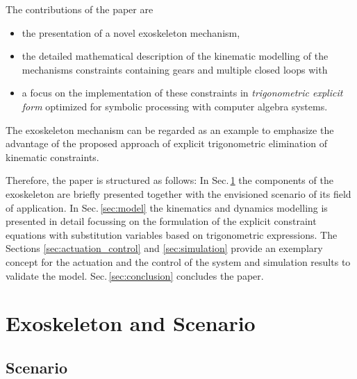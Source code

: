 \documentclass[letterpaper, 10 pt, conference]{ieeeconf}  %
\begin{document}
%
%
%
%
%

The contributions of the paper are
\begin{itemize}
    \item the presentation of a novel exoskeleton mechanism,
    \item the detailed mathematical description of the kinematic modelling of the mechanisms constraints containing gears and multiple closed loops with
    \item a focus on the implementation of these constraints in \emph{trigonometric explicit form} optimized for symbolic processing with computer algebra systems.
\end{itemize}

The exoskeleton mechanism can be regarded as an example to emphasize the advantage of the proposed approach of explicit trigonometric elimination of kinematic constraints.

Therefore, the paper is structured as follows:
In Sec.\,\ref{sec:exo_scenario} the components of the exoskeleton are briefly presented together with the envisioned scenario of its field of application. In Sec.\,\ref{sec:model} the kinematics and dynamics modelling is presented in detail focussing on the formulation of the explicit constraint equations with substitution variables based on trigonometric expressions.
The Sections \ref{sec:actuation_control} and
\ref{sec:simulation} provide an exemplary concept for the actuation and the control of the system and simulation results to validate the model. Sec.\,\ref{sec:conclusion} concludes the paper.

\section{Exoskeleton and Scenario}
\label{sec:exo_scenario}
\subsection{Scenario}
\end{document}
